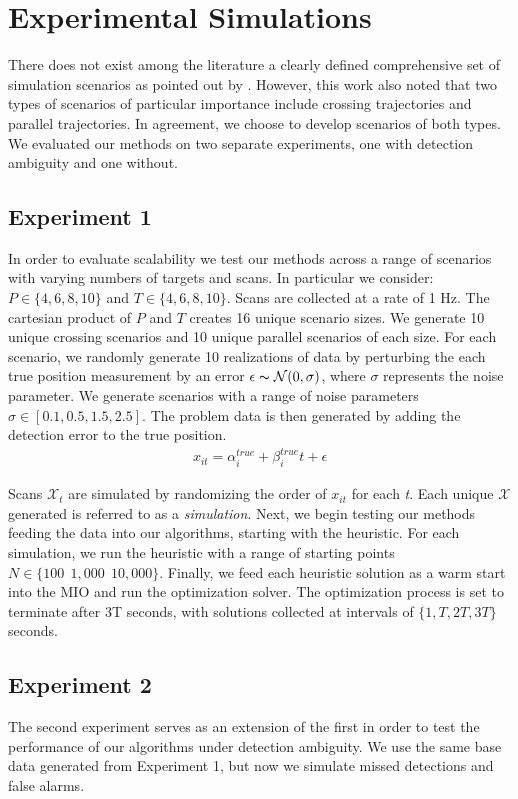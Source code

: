 \documentclass[journal]{IEEEtran}
\begin{document}
\section{Experimental Simulations}
There does not exist among the literature a clearly defined comprehensive set of simulation scenarios as pointed out by \cite{MTT-Taxonomy}.  However, this work also noted that two types of scenarios of particular importance include crossing trajectories and parallel trajectories. In agreement, we choose to develop scenarios of both types. We evaluated our methods on two separate experiments, one with detection ambiguity and one without.

\subsection{Experiment 1}
In order to evaluate scalability we test our methods across a range of scenarios with varying numbers of targets and scans. In particular we consider: $ P \in \{4, 6, 8, 10\}$ and $T \in \{4, 6, 8, 10\}$. Scans are collected at a rate of 1 Hz. The cartesian product of $P$ and $T$ creates 16 unique scenario sizes. We generate 10 unique crossing scenarios and 10 unique parallel scenarios of each size. For each scenario, we randomly generate 10 realizations of data by perturbing the each true position measurement by an error $\epsilon \thicksim \mathcal{N}(0,\sigma)$, where $\sigma$ represents the noise parameter. We generate scenarios with a range of noise parameters $\sigma \in [0.1, 0.5, 1.5, 2.5]$. The problem data is then generated by adding the detection error to the true position.
\begin{align}
	x_{it} = \alpha^{true}_{i} + \beta^{true}_{i}t+\epsilon
\end{align}

Scans $\mathcal{X}_{t}$ are simulated by randomizing the order of $x_{it}$ for each \textit{t}. Each unique $\boldsymbol{\mathcal{X}}$ generated is referred to as a \textit{simulation}. Next, we begin testing our methods feeding the data into our algorithms, starting with the heuristic. For each simulation, we run the heuristic with a range of starting points $N \in \{100\ \ 1,000\ \ 10,000\}$.
Finally, we feed each heuristic solution as a warm start into the MIO and run the optimization solver. The optimization process is set to terminate after 3T seconds, with solutions collected at intervals of $\{1,T,2T,3T\}$ seconds.

\subsection{Experiment 2}
The second experiment serves as an extension of the first in order to test the performance of our algorithms under detection ambiguity. We use the same base data generated from Experiment 1, but now we simulate missed detections and false alarms. 
\end{document}
